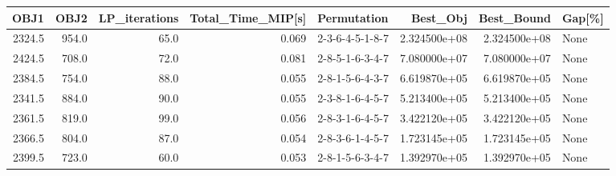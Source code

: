 \begin{tabular}{rrrrlrrl}
\toprule
   OBJ1 &   OBJ2 &  LP\_iterations &  Total\_Time\_MIP[s] &      Permutation &      Best\_Obj &    Best\_Bound & Gap[\%] \\
\midrule
 2324.5 &  954.0 &           65.0 &              0.069 &  2-3-6-4-5-1-8-7 &  2.324500e+08 &  2.324500e+08 &   None \\
 2424.5 &  708.0 &           72.0 &              0.081 &  2-8-5-1-6-3-4-7 &  7.080000e+07 &  7.080000e+07 &   None \\
 2384.5 &  754.0 &           88.0 &              0.055 &  2-8-1-5-6-4-3-7 &  6.619870e+05 &  6.619870e+05 &   None \\
 2341.5 &  884.0 &           90.0 &              0.055 &  2-3-8-1-6-4-5-7 &  5.213400e+05 &  5.213400e+05 &   None \\
 2361.5 &  819.0 &           99.0 &              0.056 &  2-8-3-1-6-4-5-7 &  3.422120e+05 &  3.422120e+05 &   None \\
 2366.5 &  804.0 &           87.0 &              0.054 &  2-8-3-6-1-4-5-7 &  1.723145e+05 &  1.723145e+05 &   None \\
 2399.5 &  723.0 &           60.0 &              0.053 &  2-8-1-5-6-3-4-7 &  1.392970e+05 &  1.392970e+05 &   None \\
\bottomrule
\end{tabular}
